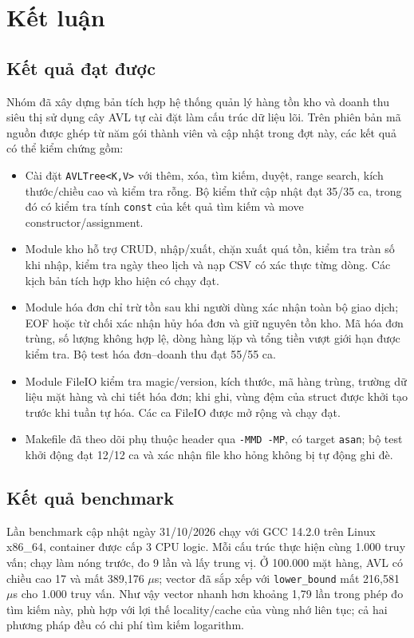 \chapter*{Kết luận}

\section*{Kết quả đạt được}
Nhóm đã xây dựng bản tích hợp hệ thống quản lý hàng tồn kho và doanh thu siêu thị sử dụng cây AVL tự cài đặt làm cấu trúc dữ liệu lõi. Trên phiên bản mã nguồn được ghép từ năm gói thành viên và cập nhật trong đợt này, các kết quả có thể kiểm chứng gồm:
\begin{itemize}
  \item Cài đặt \texttt{AVLTree<K,V>} với thêm, xóa, tìm kiếm, duyệt, range search, kích thước/chiều cao và kiểm tra rỗng. Bộ kiểm thử cập nhật đạt 35/35 ca, trong đó có kiểm tra tính \texttt{const} của kết quả tìm kiếm và move constructor/assignment.
  \item Module kho hỗ trợ CRUD, nhập/xuất, chặn xuất quá tồn, kiểm tra tràn số khi nhập, kiểm tra ngày theo lịch và nạp CSV có xác thực từng dòng. Các kịch bản tích hợp kho hiện có chạy đạt.
  \item Module hóa đơn chỉ trừ tồn sau khi người dùng xác nhận toàn bộ giao dịch; EOF hoặc từ chối xác nhận hủy hóa đơn và giữ nguyên tồn kho. Mã hóa đơn trùng, số lượng không hợp lệ, dòng hàng lặp và tổng tiền vượt giới hạn được kiểm tra. Bộ test hóa đơn--doanh thu đạt 55/55 ca.
  \item Module FileIO kiểm tra magic/version, kích thước, mã hàng trùng, trường dữ liệu mặt hàng và chi tiết hóa đơn; khi ghi, vùng đệm của struct được khởi tạo trước khi tuần tự hóa. Các ca FileIO được mở rộng và chạy đạt.
  \item Makefile đã theo dõi phụ thuộc header qua \texttt{-MMD -MP}, có target \texttt{asan}; bộ test khởi động đạt 12/12 ca và xác nhận file kho hỏng không bị tự động ghi đè.
\end{itemize}

\section*{Kết quả benchmark}
Lần benchmark cập nhật ngày 31/10/2026 chạy với GCC 14.2.0 trên Linux x86\_64, container được cấp 3 CPU logic. Mỗi cấu trúc thực hiện cùng 1.000 truy vấn; chạy làm nóng trước, đo 9 lần và lấy trung vị. Ở 100.000 mặt hàng, AVL có chiều cao 17 và mất 389,176 $\mu$s; vector đã sắp xếp với \texttt{lower\_bound} mất 216,581 $\mu$s cho 1.000 truy vấn. Như vậy vector nhanh hơn khoảng 1,79 lần trong phép đo tìm kiếm này, phù hợp với lợi thế locality/cache của vùng nhớ liên tục; cả hai phương pháp đều có chi phí tìm kiếm logarithm.

